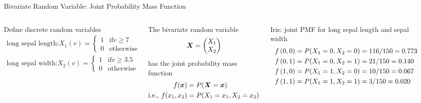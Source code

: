 \begin{frame}{Bivariate Random Variable: Joint Probability Mass
  Function}
  \small
  \begin{columns}
  Define discrete random variables
  \begin{align*}
	\text{long sepal length:} X_1(v) =
  \begin{cases}
	1 & \text{if} v \ge 7\\
	0 & \text{otherwise}
  \end{cases}\\
  \text{long sepal width:} X_2(v) =
  \begin{cases}
	1 & \text{if} v \ge 3.5\\
	0 & \text{otherwise}
  \end{cases}
  \end{align*}

  \smallskip
  The bivariate random variable
  $${\boldsymbol X} = \begin{pmatrix} X_1\\ X_2 \end{pmatrix}$$
  has the joint probability mass function
\begin{align*}
    f({\boldsymbol x}) & = P({\boldsymbol X} = {\boldsymbol x})\\
	\text{i.e., } f(x_1,x_2) & = P(X_1=x_1, X_2=x_2)
\end{align*}

    \centering
	\small
	Iris: joint PMF for long sepal length and sepal width
	    \begin{align*}
		  \tiny
        f\left(0, 0\right) & = P(X_1=0, X_2=0) = {116/150} = 0.773\\
        f\left(0, 1\right) & = P(X_1=0, X_2=1) = {21/150} = 0.140\\
        f\left(1, 0\right) & = P(X_1=1, X_2=0) = {10/150} = 0.067\\
        f\left(1, 1\right) & = P(X_1=1, X_2=1) = {3/150} = 0.020
    \end{align*}
  \end{columns}
\end{frame}


